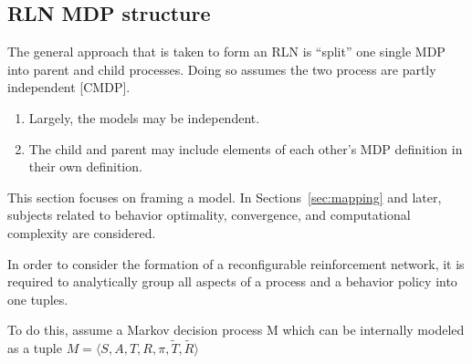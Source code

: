 \subsection{RLN MDP structure}
\label{sec:rlnmdpstructure}

The general approach that is taken to form an RLN is ``split'' one single MDP into parent and child processes. Doing so assumes the two process are partly independent [CMDP]. 

\begin{enumerate}[label=\arabic*.]
\item Largely, the models may be independent.
\item The child and parent may include elements of each other's MDP definition in their own definition.
\end{enumerate}

This section focuses on framing a model. In Sections~\ref{sec:mapping} and later, subjects related to behavior optimality, convergence, and computational complexity are considered.

In order to consider the formation of a reconfigurable reinforcement network, it is required to analytically group all aspects of a process and a behavior policy into one tuples.

\begin{center}
\end{center}

To do this, assume a Markov decision process M which can be internally modeled as a tuple \( M = \langle S, A, T, R, \pi, \tilde{T}, \tilde{R}\rangle \)\\

